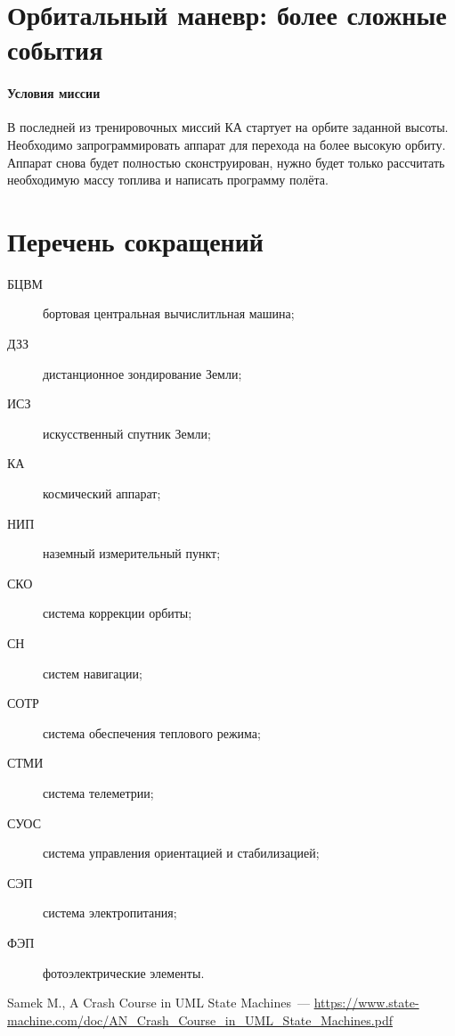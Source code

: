 \documentclass[12pt,a4paper]{article}
\begin{document}
\clearpage
\section{Орбитальный маневр: более сложные события}

\paragraph{Условия миссии} В последней из тренировочных миссий КА стартует на орбите
заданной высоты. Необходимо запрограммировать аппарат для перехода на более высокую
орбиту. Аппарат снова будет полностью сконструирован, нужно будет только рассчитать
необходимую массу топлива и написать программу полёта.



\section*{Перечень сокращений}

\begin{description}
\item[БЦВМ] бортовая центральная вычислитльная машина;
\item[ДЗЗ] дистанционное зондирование Земли;
\item[ИСЗ] искусственный спутник Земли;
\item[КА] космический аппарат;
\item[НИП] наземный измерительный пункт;
\item[СКО] система коррекции орбиты;
\item[СН] систем навигации;
\item[СОТР] система обеспечения теплового режима;
\item[СТМИ] система телеметрии;
\item[СУОС] система управления ориентацией и стабилизацией;
\item[СЭП] система электропитания;
\item[ФЭП] фотоэлектрические элементы.
\end{description}

\begin{thebibliography}{2}
 Samek M., A Crash Course in UML State Machines~---
  \url{https://www.state-machine.com/doc/AN_Crash_Course_in_UML_State_Machines.pdf}
\end{thebibliography}
\end{document}
